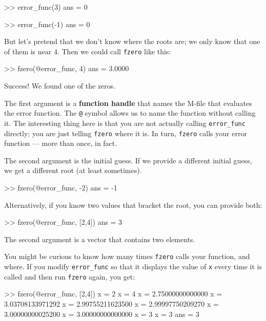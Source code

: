 \documentclass[
]{book}
\numberwithin{Answer}{chapter}
\numberwithin{Exercise}{chapter}
\begin{document}
\begin{code}
>> error_func(3)
ans = 0

>> error_func(-1)
ans = 0
\end{code}

But let's pretend that we don't know where
the roots are; we only know that one of them is near 4.  Then
we could call {\tt fzero} like this:

\begin{code}
>> fzero(@error_func, 4)
ans = 3.0000
\end{code}

Success!  We found one of the zeros.

The first argument is a
{\bf function handle} that names the M-file that evaluates
the error function.  The {\tt @} symbol allows us to name the
function without calling it.  The interesting thing here is
that you are not actually calling {\tt error\_func} directly;
you are just telling {\tt fzero} where it is.  In turn, {\tt fzero}
calls your error function --- more than once, in fact.


The second argument is the initial guess.  If we provide a different
initial guess, we get a different root (at least sometimes).

\begin{code}
>> fzero(@error_func, -2)
ans = -1
\end{code}

Alternatively, if you know two values that bracket the root,
you can provide both:

\begin{code}
>> fzero(@error_func, [2,4])
ans = 3
\end{code}

The second argument is a vector that contains two elements.  


You might be curious to know how many times {\tt fzero} calls your
function, and where.  If you modify {\tt error\_func} so that it displays
the value of {\tt x} every time it is called and then run {\tt fzero}
again, you get:

\begin{code}
>> fzero(@error_func, [2,4])
x = 2
x = 4
x = 2.75000000000000
x = 3.03708133971292
x = 2.99755211623500
x = 2.99997750209270
x = 3.00000000025200
x = 3.00000000000000
x = 3
x = 3
ans = 3
\end{code}
\end{document}
